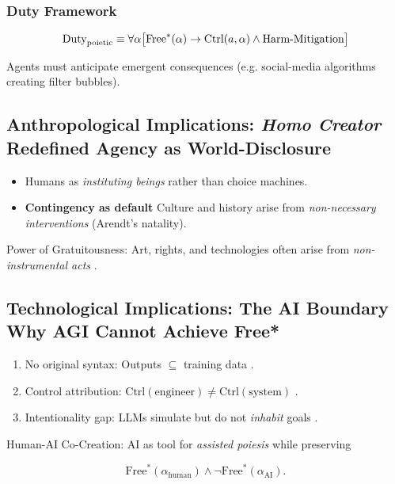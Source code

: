 \documentclass[11pt,a4paper]{article}
\begin{document}
\subsubsection{Duty Framework}

\[
\text{Duty}_{\text{poietic}}\equiv\forall\alpha\big{[}\text{Free}^{*}(\alpha)\rightarrow\text{Ctrl}(a,\alpha)\wedge\text{Harm-Mitigation}\big{]}
\]

Agents must anticipate emergent consequences (e.g. social-media algorithms creating filter bubbles).

\subsection{Anthropological Implications: \emph{Homo Creator} Redefined Agency as World-Disclosure}\label{sec:implications-anthro}

\begin{itemize}
  \item Humans as \emph{instituting beings} \cite{carbonell2022} rather than choice machines.
  \item \textbf{Contingency as default} Culture and history arise from \emph{non-necessary interventions} (Arendt's natality).
\end{itemize}

Power of Gratuitousness: Art, rights, and technologies often arise from \emph{non-instrumental acts} \cite{haase2022}.

\subsection{Technological Implications: The AI Boundary Why AGI Cannot Achieve Free*}\label{sec:implications-tech}

\begin{enumerate}
  \item No original syntax: Outputs \(\subseteq\) training data \cite{floridi2024}.
  \item Control attribution: \(\text{Ctrl}(\text{engineer})\neq\text{Ctrl}(\text{system})\) \cite{coeckelbergh2023}.
  \item Intentionality gap: LLMs simulate but do not \emph{inhabit} goals \cite{dennett2022}.
\end{enumerate}

Human-AI Co-Creation: AI as tool for \emph{assisted poiesis} while preserving

\[
\text{Free}^{*}(\alpha_{\text{human}})\wedge\neg\text{Free}^{*}(\alpha_{\text{AI}}).
\]
\end{document}
